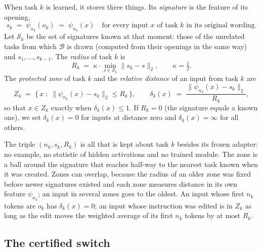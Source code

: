 \begin{definition}
When task $k$ is learned, it stores three things. Its \emph{signature} is the feature of its opening,
\begin{equation}
  s_k \;=\; \psi_{n_k}(o_k) \;=\; \psi_{n_k}(x) \quad \text{for every input } x \text{ of task } k \text{ in its original wording}.
  \label{eq:signature}
\end{equation}
Let $\mathcal{S}_k$ be the set of signatures known at that moment: those of the unrelated
tasks from which $\mathcal{B}$ is drawn (computed from their openings in the same way) and
$s_1, \dots, s_{k-1}$. The \emph{radius} of task $k$ is
\begin{equation}
  R_k \;=\; \kappa \cdot \min_{s \in \mathcal{S}_k} \lVert s_k - s \rVert_2 , \qquad \kappa = \tfrac{1}{2} .
  \label{eq:radius}
\end{equation}
The \emph{protected zone} of task $k$ and the \emph{relative distance} of an input from task $k$ are
\begin{equation}
  Z_k \;=\; \{\, x \;:\; \lVert \psi_{n_k}(x) - s_k \rVert_2 \le R_k \,\} ,
  \qquad
  \delta_k(x) \;=\; \frac{\lVert \psi_{n_k}(x) - s_k \rVert_2}{R_k} ,
  \label{eq:zone}
\end{equation}
so that $x \in Z_k$ exactly when $\delta_k(x) \le 1$. If $R_k = 0$ (the signature equals a known one), we set $\delta_k(x) = 0$ for inputs at distance zero and
$\delta_k(x) = \infty$ for all others.
\end{definition}

The triple $(n_k, s_k, R_k)$ is all that is kept about task $k$ besides its frozen adapter: no
example, no statistic of hidden activations and no trained module. The zone is a ball around the
signature that reaches half-way to the nearest task known when it was created. Zones can overlap,
because the radius of an older zone was fixed before newer signatures existed and each zone measures
distance in its own feature $\psi_{n_k}$; an input in several zones goes to the oldest. An input
whose first $n_k$ tokens are $o_k$ has $\delta_k(x) = 0$; an input whose instruction was edited
is in $Z_k$ as long as the edit moves the weighted average of its first $n_k$ tokens by at most $R_k$.

\subsection{The certified switch}
\label{sec:switch}


